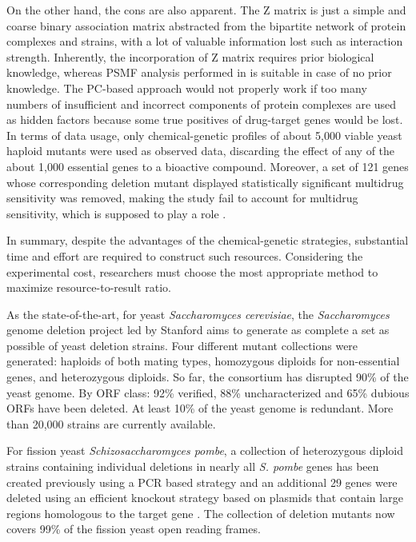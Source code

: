 \documentclass[12pt,fullpage,singlespace]{article}
\begin{document}
On the other hand, the cons are also apparent. The Z matrix is just a simple and coarse binary association matrix abstracted from the bipartite network of protein complexes and strains, with a lot of valuable information lost such as interaction strength. Inherently, the incorporation of Z matrix requires prior biological knowledge, whereas PSMF analysis performed in \citep{1078} is suitable in case of no prior knowledge. The PC-based approach would not properly work if too many numbers of insufficient and incorrect components of protein complexes are used as hidden factors because some true positives of drug-target genes would be lost. In terms of data usage, only chemical-genetic profiles of about 5,000 viable yeast haploid mutants were used as observed data, discarding the effect of any of the about 1,000 essential genes to a bioactive compound. Moreover, a set of 121 genes whose corresponding deletion mutant displayed statistically significant multidrug sensitivity was removed, making the study fail to account for multidrug sensitivity, which is supposed to play a role \citep{1080}.

In summary, despite the advantages of the chemical-genetic strategies, substantial time and effort are required to construct such resources. Considering the experimental cost, researchers must choose the most appropriate method to maximize resource-to-result ratio.

As the state-of-the-art, for yeast \textit{Saccharomyces cerevisiae}, the \textit{Saccharomyces} genome deletion project led by Stanford \citep{1107} aims to generate as complete a set as possible of yeast deletion strains. Four different mutant collections were generated: haploids of both mating types, homozygous diploids for non-essential genes, and heterozygous diploids. So far, the consortium has disrupted 90\% of the yeast genome. By ORF class: 92\% verified, 88\% uncharacterized and 65\% dubious ORFs have been deleted. At least 10\% of the yeast genome is redundant. More than 20,000 strains are currently available.

For fission yeast \textit{Schizosaccharomyces pombe}, a collection of heterozygous diploid strains containing individual deletions in nearly all \textit{S. pombe} genes has been created previously using a PCR based strategy and an additional 29 genes were deleted using an efficient knockout strategy based on plasmids that contain large regions homologous to the target gene \citep{1108}. The collection of deletion mutants now covers 99\% of the fission yeast open reading frames.
\end{document}
